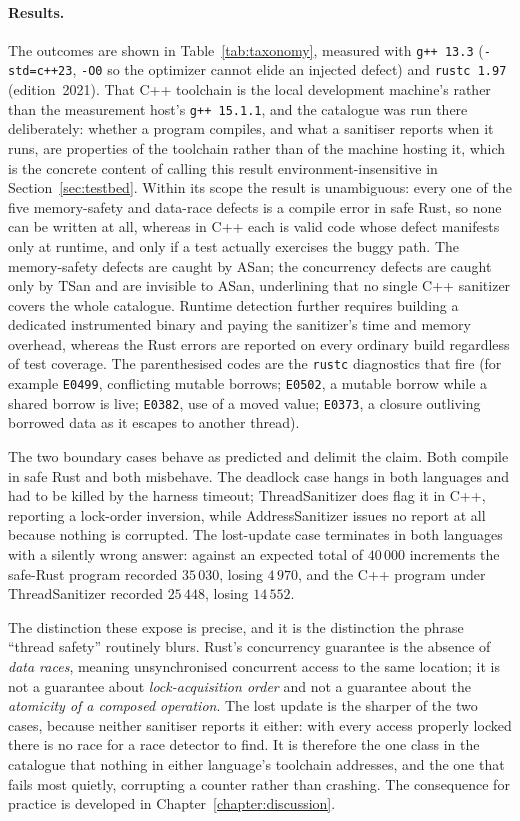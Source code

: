 \documentclass[english,twoside,openright,a4paper,censored,csm,software-track-2020]{HYthesisML}
\begin{document}
\paragraph{Results.}
The outcomes are shown in Table~\ref{tab:taxonomy}, measured with \texttt{g++~13.3}
(\texttt{-std=c++23}, \texttt{-O0} so the optimizer cannot elide an injected defect) and
\texttt{rustc~1.97} (edition~2021). That C++ toolchain is the local development machine's
rather than the measurement host's \texttt{g++~15.1.1}, and the catalogue was run there
deliberately: whether a program compiles, and what a sanitiser reports when it runs, are
properties of the toolchain rather than of the machine hosting it, which is the concrete
content of calling this result environment-insensitive in
Section~\ref{sec:testbed}. Within its scope the result is unambiguous: every one of
the five memory-safety and data-race defects is a compile error in safe Rust, so none can be
written at all, whereas in C++ each is valid code whose defect manifests only at runtime, and
only if a test actually exercises the buggy path. The memory-safety defects are caught by ASan;
the concurrency defects are caught only by TSan and are invisible to ASan, underlining that no
single C++ sanitizer covers the whole catalogue. Runtime detection further requires building a
dedicated instrumented binary and paying the sanitizer's time and memory overhead, whereas the
Rust errors are reported on every ordinary build regardless of test coverage. The parenthesised
codes are the \texttt{rustc} diagnostics that fire (for example \texttt{E0499}, conflicting
mutable borrows; \texttt{E0502}, a mutable borrow while a shared borrow is live; \texttt{E0382},
use of a moved value; \texttt{E0373}, a closure outliving borrowed data as it escapes to another
thread).

The two boundary cases behave as predicted and delimit the claim. Both compile in safe Rust and
both misbehave. The deadlock case hangs in both languages and had to be killed by the harness
timeout; ThreadSanitizer does flag it in C++, reporting a lock-order inversion, while
AddressSanitizer issues no report at all because nothing is corrupted. The lost-update case
terminates in both languages with a silently wrong answer: against an expected total of
$40\,000$ increments the safe-Rust program recorded $35\,030$, losing $4\,970$, and the C++
program under ThreadSanitizer recorded $25\,448$, losing $14\,552$.

The distinction these expose is precise, and it is the distinction the phrase ``thread safety''
routinely blurs. Rust's concurrency guarantee is the absence of \emph{data races}, meaning
unsynchronised concurrent access to the same location; it is not a guarantee about
\emph{lock-acquisition order} and not a guarantee about the \emph{atomicity of a composed
operation}. The lost update is the sharper of the two cases, because neither sanitiser reports
it either: with every access properly locked there is no race for a race detector to find. It
is therefore the one class in the catalogue that nothing in either language's toolchain
addresses, and the one that fails most quietly, corrupting a counter rather than crashing. The
consequence for practice is developed in Chapter~\ref{chapter:discussion}.
\end{document}
